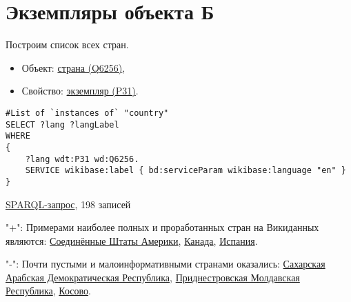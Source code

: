 \section{Экземпляры объекта Б}

Построим список всех стран.

\begin{itemize}
    \item Объект: \href{https://www.wikidata.org/wiki/Q6256}{страна (Q6256)},
    \item Свойство: \href{https://www.wikidata.org/wiki/Property:P31}{экземпляр (P31)}.
\end{itemize}

\begin{lstlisting}[language=SPARQL]
#List of `instances of` "country" 
SELECT ?lang ?langLabel
WHERE
{
    ?lang wdt:P31 wd:Q6256.
    SERVICE wikibase:label { bd:serviceParam wikibase:language "en" }
}
\end{lstlisting}

\href{https://query.wikidata.org/#%23added%202017-02%0A%23List%20of%20%60instances%20of%60%20%22country%22%20%0ASELECT%20%3Flang%20%3FlangLabel%0AWHERE%0A%7B%0A%20%20%20%20%3Flang%20wdt%3AP31%20wd%3AQ6256.%0A%20%20%20%20SERVICE%20wikibase%3Alabel%20%7B%20bd%3AserviceParam%20wikibase%3Alanguage%20%22en%22%20%7D%0A%7D}{SPARQL-запрос}, 198 записей

"+": Примерами наиболее полных и проработанных стран на Викиданных являются:
\href{https://www.wikidata.org/wiki/Q30}{Соединённые Штаты Америки}, 
\href{https://www.wikidata.org/wiki/Q16}{Канада},
\href{https://www.wikidata.org/wiki/Q29}{Испания}.

"-": Почти пустыми и малоинформативными странами оказались:
\href{https://www.wikidata.org/wiki/Q40362}{Сахарская Арабская Демократическая Республика},
\href{https://www.wikidata.org/wiki/Q907112}{Приднестровская Молдавская Республика},
\href{https://www.wikidata.org/wiki/Q1246}{Косово}.